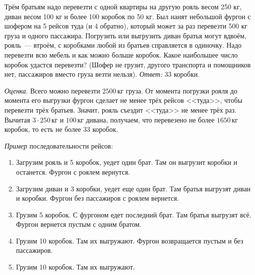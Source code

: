 \problem
Трём братьям надо перевезти с одной квартиры на другую рояль весом 250 кг,
диван весом 100 кг и более 100 коробок по 50 кг.
Был нанят небольшой фургон с шофером на 5 рейсов туда (и 4 обратно), который
может за раз перевезти 500 кг груза и одного пассажира.
Погрузить или выгрузить диван братья могут вдвоём, рояль~--- втроём, с
коробками любой из братьев справляется в одиночку.
Надо перевезти всю мебель и как можно больше коробок.
Какое наибольшее число коробок удастся перевезти?
(Шофер не грузит, другого транспорта и помощников нет, пассажиров вместо груза
везти нельзя).
\solution
\emph{Ответ:} 33 коробки.
\par
\emph{Оценка}.
Всего можно перевезти $2500 \, \text{кг}$ груза.
От момента погрузки рояля до момента его выгрузки фургон сделает не менее трёх
рейсов <<туда>>, чтобы перевезти трёх братьев.
Значит, рояль съездит <<туда>> не менее трёх раз.
Вычитая $3 \cdot 250 \, \text{кг}$ и $100 \, \text{кг}$ дивана, получаем, что
перевезено не более $1650 \, \text{кг}$ коробок, то есть не более $33$ коробок.
\par
\emph{Пример} последовательности рейсов:
\begin{enumerate}
\item
Загрузим рояль и 5 коробок, уедет один брат.
Там он выгрузит коробки и останется.
Фургон с роялем вернутся.
\item
Загрузим диван и 3 коробки, уедет еще один брат.
Там братья выгрузят диван и коробки.
Фургон без пассажиров с роялем вернется.
\item
Грузим 5 коробок.
С фургоном едет последний брат.
Там братья выгрузят всё.
Фургон вернется пустым с одним братом.
\item
Грузим 10 коробок.
Там их выгружают.
Фургон возвращается пустым и без пассажиров.
\item
Грузим 10 коробок.
Там их выгружают.
\end{enumerate}
\endproblem
